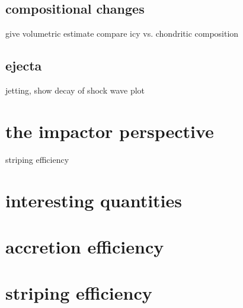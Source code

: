 \subsection{compositional changes}
give volumetric estimate
compare icy vs. chondritic composition

\subsection{ejecta}
jetting, show decay of shock wave plot

\section{the impactor perspective}
striping efficiency


\section{interesting quantities}
\section{accretion efficiency}
\section{striping efficiency}

\cite{Chambers:2001p2105}
\citep{chandrasekhar1969ellipsoidal}
\cite{Lissauer:1993p56}
\cite{Wetherill:1993p3351}






